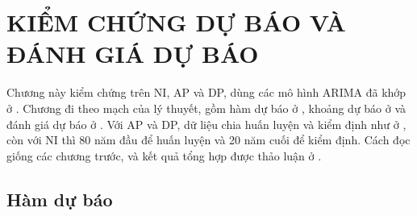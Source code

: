 \section[Kiểm chứng dự báo và đánh giá dự báo]{KIỂM CHỨNG DỰ BÁO VÀ ĐÁNH GIÁ DỰ BÁO}

Chương này kiểm chứng  trên NI, AP và DP, dùng các mô hình ARIMA đã khớp ở . Chương đi theo mạch của lý thuyết, gồm hàm dự báo ở , khoảng dự báo ở  và đánh giá dự báo ở . Với AP và DP, dữ liệu chia huấn luyện và kiểm định như ở , còn với NI thì 80 năm đầu để huấn luyện và 20 năm cuối để kiểm định. Cách đọc giống các chương trước, và kết quả tổng hợp được thảo luận ở .

\subsection{Hàm dự báo}

